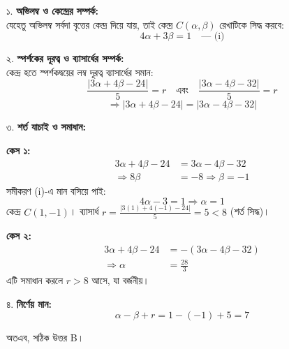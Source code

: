 \documentclass[12pt, a4paper]{article}
\begin{document}
\begin{tcolorbox}[solutionbox={সমাধান (Solution)}]
    \noindent
    ১. \textbf{অভিলম্ব ও কেন্দ্রের সম্পর্ক:} \\
    যেহেতু অভিলম্ব সর্বদা বৃত্তের কেন্দ্র দিয়ে যায়, তাই কেন্দ্র $C(\alpha, \beta)$ রেখাটিকে সিদ্ধ করবে:
    \[ 4\alpha + 3\beta = 1 \quad \text{--- (i)} \]
    
    \vspace{0.5em}
    ২. \textbf{স্পর্শকের দূরত্ব ও ব্যাসার্ধের সম্পর্ক:} \\
    কেন্দ্র হতে স্পর্শকদ্বয়ের লম্ব দূরত্ব ব্যাসার্ধের সমান:
    \[ \frac{|3\alpha + 4\beta - 24|}{5} = r \quad \text{এবং} \quad \frac{|3\alpha - 4\beta - 32|}{5} = r \]
    \[ \Rightarrow |3\alpha + 4\beta - 24| = |3\alpha - 4\beta - 32| \]
    
    \vspace{0.5em}
    ৩. \textbf{শর্ত যাচাই ও সমাধান:}
    
    \vspace{0.5em}
    \textbf{কেস ১:}
    \begin{align*}
        3\alpha + 4\beta - 24 &= 3\alpha - 4\beta - 32 \\
        \Rightarrow 8\beta &= -8 \Rightarrow \beta = -1
    \end{align*}
    সমীকরণ (i)-এ মান বসিয়ে পাই: 
    \[ 4\alpha - 3 = 1 \Rightarrow \alpha = 1 \]
    কেন্দ্র $C(1, -1)$। ব্যাসার্ধ $r = \frac{|3(1) + 4(-1) - 24|}{5} = 5 < 8$ (শর্ত সিদ্ধ)।
    
    \vspace{0.5em}
    \textbf{কেস ২:}
    \begin{align*}
        3\alpha + 4\beta - 24 &= -(3\alpha - 4\beta - 32) \\
        \Rightarrow \alpha &= \frac{28}{3}
    \end{align*}
    এটি সমাধান করলে $r > 8$ আসে, যা বর্জনীয়।
    
    \vspace{0.5em}
    ৪. \textbf{নির্ণেয় মান:}
    \[ \alpha - \beta + r = 1 - (-1) + 5 = 7 \]
    
    \vspace{0.5em}
    অতএব, সঠিক উত্তর B।
\end{tcolorbox}
\end{document}
